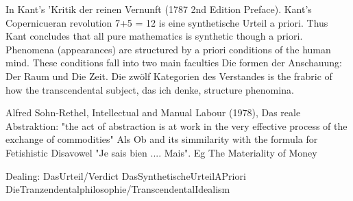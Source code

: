 In Kant's 'Kritik der reinen Vernunft (1787 2nd Edition Preface). Kant's Copernicueran revolution
7+5 = 12 is eine synthetische Urteil a priori. Thus Kant concludes that all pure mathematics is synthetic though a priori. Phenomena (appearances) are structured by a priori conditions of the human mind. These conditions fall into two main faculties Die formen der Anschauung: Der Raum und Die Zeit. Die zwölf Kategorien des Verstandes is the frabric of how the transcendental subject, das ich denke, structure phenomina. 

Alfred Sohn-Rethel, Intellectual and Manual Labour (1978), 
Das reale Abstraktion: "the act of abstraction is at work in the very effective process of the exchange of commodities"
Als Ob and its simmilarity with the formula for Fetishistic Disavowel "Je sais bien .... Mais".
Eg The Materiality of Money

Dealing: DasUrteil/Verdict DasSynthetischeUrteilAPriori DieTranzendentalphilosophie/TranscendentalIdealism
